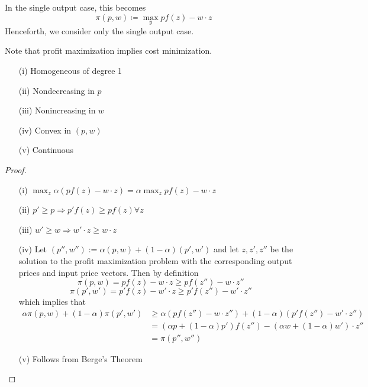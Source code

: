 \documentclass[12pt]{article}
\begin{document}
\begin{remark}
	In the single output case, this becomes
	\[
	\pi(p,w) \coloneqq \max_y p f(z) - w \cdot z 
	\]
	Henceforth, we consider only the single output case.
\end{remark}
\begin{remark}
	Note that profit maximization implies cost minimization.
\end{remark}

\begin{proposition}\label{prop:profit_properties}
	\begin{itemize}
		\item[(i)] Homogeneous of degree 1
		\item[(ii)] Nondecreasing in $p$
		\item[(iii)] Nonincreasing in $w$
		\item[(iv)] Convex in $(p,w)$
		\item[(v)] Continuous
	\end{itemize}
\end{proposition}
\begin{proof}
	\begin{itemize}
		\item[(i)] $\max_z \alpha (pf(z) - w\cdot z) = \alpha \max_z pf(z) - w\cdot z$
		\item[(ii)] $p' \ge p \Longrightarrow p' f(z) \ge p f(z) \forall z$
		\item[(iii)] $w' \ge w \Longrightarrow w' \cdot z \ge w \cdot z$
		\item[(iv)] Let $(p'',w'') := \alpha (p,w) + (1-\alpha)(p',w')$ and let $z,z',z''$ be the solution to the profit maximization problem with the corresponding output prices and input price vectors. Then by definition
		\[
		\pi(p,w) = pf(z) - w \cdot z \ge p f(z'') - w \cdot z''
		\]
		\[
		\pi(p',w') = p'f(z) - w' \cdot z \ge p' f(z'') - w' \cdot z''
		\]
		which implies that
		\begin{align*}
		\alpha \pi(p,w) + (1-\alpha)\pi(p',w') &\ge \alpha (p f(z'') - w \cdot z'') + (1-\alpha) ( p' f(z'') - w' \cdot z'') \\
		&= (\alpha p + (1-\alpha)p') f(z'') - (\alpha w + (1-\alpha)w' )\cdot z'' \\
		&= \pi(p'',w'')
		\end{align*}
		\item[(v)] Follows from Berge's Theorem
	\end{itemize}
\end{proof}
\end{document}
